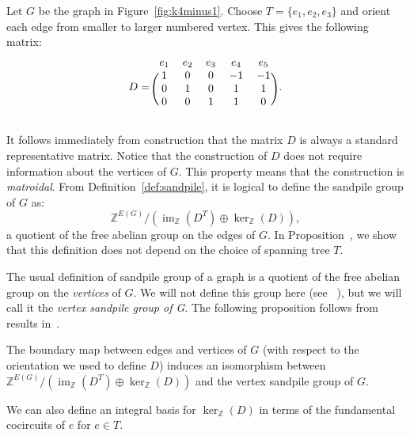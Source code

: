 \documentclass[ALCO,ThmDefs,Unicode,epreuves]{cedram}
\newcommand{\Z}{\mathbb{Z}}
\DeclareMathOperator{\Ima}{im}
\begin{document}
\begin{exam}
Let $G$ be the graph in Figure~\ref{fig:k4minus1}. Choose $T = \{e_1,e_2,e_3\}$ and orient each edge from smaller to larger numbered vertex. This gives the following matrix:
\[
D = 
\begin{blockarray}{ccccc}
 e_1 & e_2 & e_3 & e_4 & e_5 \\
\begin{block}{(ccccc)}
 1 & 0 & 0 & -1 & -1 \\
 0 & 1 & 0 & 1 & 1 \\
 0 & 0 & 1 & 1 & 0 \\
\end{block}
\end{blockarray}\,.
 \]
\end{exam}

It follows immediately from construction that the matrix $D$ is always a standard representative matrix. Notice that the construction of $D$ does not require information about the vertices of $G$. This property means that the construction is \emph{matroidal}. From Definition~\ref{def:sandpile}, it is logical to define the sandpile group of $G$ as:
\[
\Z^{E(G)}/(\Ima_\Z(D^T) \oplus \ker_\Z(D)),
\] 
a quotient of the free abelian group on the edges of $G$. In Proposition~\cite[4.1.8]{mythesis}, we show that this definition does not depend on the choice of spanning tree $T$.

The usual definition of sandpile group of a graph is a quotient of the free abelian group on the \emph{vertices} of $G$. We will not define this group here (see \eg~\cite{Klivans}), but we will call it the \emph{vertex sandpile group of G}. The following proposition follows from results in~\cite{Bacher,Biggs}.

\begin{prop}
The boundary map between edges and vertices of $G$ (with respect to the orientation we used to define $D$) induces an isomorphism between $\Z^{E(G)}/(\Ima_\Z(D^T) \oplus \ker_\Z(D))$ and the vertex sandpile group of $G$. 
\end{prop}

We can also define an integral basis for $\ker_\Z(D)$ in terms of the fundamental cocircuits of $e$ for $e \in T$. 
\end{document}
